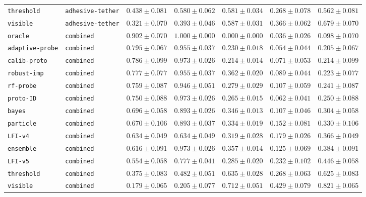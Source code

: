 \documentclass{article}
\begin{document}
\begin{center}
{\begin{tabular}{llccccc}
\texttt{threshold} & \texttt{adhesive-tether} & $0.438 \pm 0.081$ & $0.580 \pm 0.062$ & $0.581 \pm 0.034$ & $0.268 \pm 0.078$ & $0.562 \pm 0.081$ \\
\texttt{visible} & \texttt{adhesive-tether} & $0.321 \pm 0.070$ & $0.393 \pm 0.046$ & $0.587 \pm 0.031$ & $0.366 \pm 0.062$ & $0.679 \pm 0.070$ \\
\texttt{oracle} & \texttt{combined} & $0.902 \pm 0.070$ & $1.000 \pm 0.000$ & $0.000 \pm 0.000$ & $0.036 \pm 0.026$ & $0.098 \pm 0.070$ \\
\texttt{adaptive-probe} & \texttt{combined} & $0.795 \pm 0.067$ & $0.955 \pm 0.037$ & $0.230 \pm 0.018$ & $0.054 \pm 0.044$ & $0.205 \pm 0.067$ \\
\texttt{calib-proto} & \texttt{combined} & $0.786 \pm 0.099$ & $0.973 \pm 0.026$ & $0.214 \pm 0.014$ & $0.071 \pm 0.053$ & $0.214 \pm 0.099$ \\
\texttt{robust-imp} & \texttt{combined} & $0.777 \pm 0.077$ & $0.955 \pm 0.037$ & $0.362 \pm 0.020$ & $0.089 \pm 0.044$ & $0.223 \pm 0.077$ \\
\texttt{rf-probe} & \texttt{combined} & $0.759 \pm 0.087$ & $0.946 \pm 0.051$ & $0.279 \pm 0.029$ & $0.107 \pm 0.059$ & $0.241 \pm 0.087$ \\
\texttt{proto-ID} & \texttt{combined} & $0.750 \pm 0.088$ & $0.973 \pm 0.026$ & $0.265 \pm 0.015$ & $0.062 \pm 0.041$ & $0.250 \pm 0.088$ \\
\texttt{bayes} & \texttt{combined} & $0.696 \pm 0.058$ & $0.893 \pm 0.026$ & $0.346 \pm 0.013$ & $0.107 \pm 0.046$ & $0.304 \pm 0.058$ \\
\texttt{particle} & \texttt{combined} & $0.670 \pm 0.106$ & $0.893 \pm 0.037$ & $0.334 \pm 0.019$ & $0.152 \pm 0.081$ & $0.330 \pm 0.106$ \\
\texttt{LFI-v4} & \texttt{combined} & $0.634 \pm 0.049$ & $0.634 \pm 0.049$ & $0.319 \pm 0.028$ & $0.179 \pm 0.026$ & $0.366 \pm 0.049$ \\
\texttt{ensemble} & \texttt{combined} & $0.616 \pm 0.091$ & $0.973 \pm 0.026$ & $0.357 \pm 0.014$ & $0.125 \pm 0.069$ & $0.384 \pm 0.091$ \\
\texttt{LFI-v5} & \texttt{combined} & $0.554 \pm 0.058$ & $0.777 \pm 0.041$ & $0.285 \pm 0.020$ & $0.232 \pm 0.102$ & $0.446 \pm 0.058$ \\
\texttt{threshold} & \texttt{combined} & $0.375 \pm 0.083$ & $0.482 \pm 0.051$ & $0.635 \pm 0.028$ & $0.268 \pm 0.063$ & $0.625 \pm 0.083$ \\
\texttt{visible} & \texttt{combined} & $0.179 \pm 0.065$ & $0.205 \pm 0.077$ & $0.712 \pm 0.051$ & $0.429 \pm 0.079$ & $0.821 \pm 0.065$ \\

\end{tabular}}
\end{center}
\end{document}
